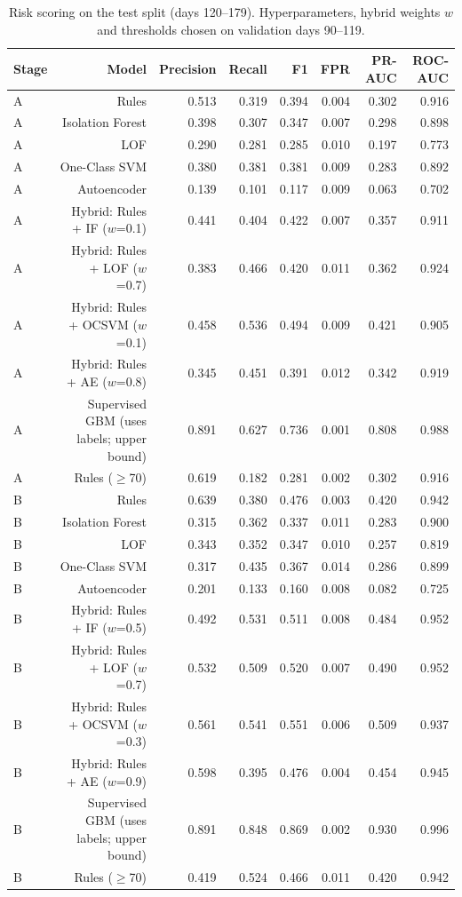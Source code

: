 \begin{table}[ht]
\centering\small
\caption{Risk scoring on the test split (days 120--179). Hyperparameters, hybrid weights $w$ and thresholds chosen on validation days 90--119.}
\label{tab:model-comparison}
\begin{tabular}{lrrrrrrr}
\hline
Stage & Model & Precision & Recall & F1 & FPR & PR-AUC & ROC-AUC \\
\hline
A & Rules & 0.513 & 0.319 & 0.394 & 0.004 & 0.302 & 0.916 \\
A & Isolation Forest & 0.398 & 0.307 & 0.347 & 0.007 & 0.298 & 0.898 \\
A & LOF & 0.290 & 0.281 & 0.285 & 0.010 & 0.197 & 0.773 \\
A & One-Class SVM & 0.380 & 0.381 & 0.381 & 0.009 & 0.283 & 0.892 \\
A & Autoencoder & 0.139 & 0.101 & 0.117 & 0.009 & 0.063 & 0.702 \\
A & Hybrid: Rules + IF ($w$=0.1) & 0.441 & 0.404 & 0.422 & 0.007 & 0.357 & 0.911 \\
A & Hybrid: Rules + LOF ($w$=0.7) & 0.383 & 0.466 & 0.420 & 0.011 & 0.362 & 0.924 \\
A & Hybrid: Rules + OCSVM ($w$=0.1) & 0.458 & 0.536 & 0.494 & 0.009 & 0.421 & 0.905 \\
A & Hybrid: Rules + AE ($w$=0.8) & 0.345 & 0.451 & 0.391 & 0.012 & 0.342 & 0.919 \\
A & Supervised GBM (uses labels; upper bound) & 0.891 & 0.627 & 0.736 & 0.001 & 0.808 & 0.988 \\
A & Rules ($\geq$70) & 0.619 & 0.182 & 0.281 & 0.002 & 0.302 & 0.916 \\
B & Rules & 0.639 & 0.380 & 0.476 & 0.003 & 0.420 & 0.942 \\
B & Isolation Forest & 0.315 & 0.362 & 0.337 & 0.011 & 0.283 & 0.900 \\
B & LOF & 0.343 & 0.352 & 0.347 & 0.010 & 0.257 & 0.819 \\
B & One-Class SVM & 0.317 & 0.435 & 0.367 & 0.014 & 0.286 & 0.899 \\
B & Autoencoder & 0.201 & 0.133 & 0.160 & 0.008 & 0.082 & 0.725 \\
B & Hybrid: Rules + IF ($w$=0.5) & 0.492 & 0.531 & 0.511 & 0.008 & 0.484 & 0.952 \\
B & Hybrid: Rules + LOF ($w$=0.7) & 0.532 & 0.509 & 0.520 & 0.007 & 0.490 & 0.952 \\
B & Hybrid: Rules + OCSVM ($w$=0.3) & 0.561 & 0.541 & 0.551 & 0.006 & 0.509 & 0.937 \\
B & Hybrid: Rules + AE ($w$=0.9) & 0.598 & 0.395 & 0.476 & 0.004 & 0.454 & 0.945 \\
B & Supervised GBM (uses labels; upper bound) & 0.891 & 0.848 & 0.869 & 0.002 & 0.930 & 0.996 \\
B & Rules ($\geq$70) & 0.419 & 0.524 & 0.466 & 0.011 & 0.420 & 0.942 \\
\hline
\end{tabular}
\end{table}
